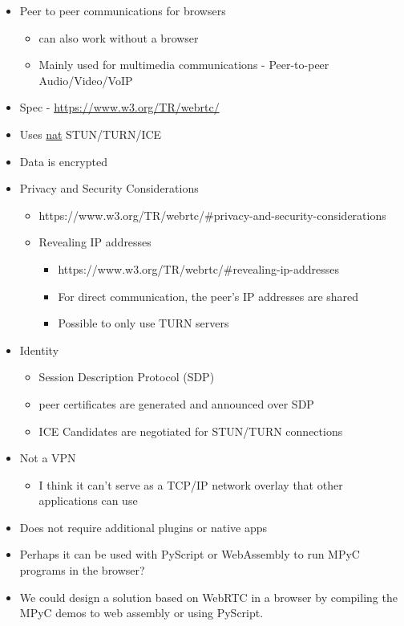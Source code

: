 \begin{itemize}
\tightlist
\item
  Peer to peer communications for browsers

  \begin{itemize}
  \tightlist
  \item
    can also work without a browser
  \item
    Mainly used for multimedia communications - Peer-to-peer Audio/Video/VoIP
  \end{itemize}
\item
  Spec - \href{https://www.w3.org/TR/webrtc/\#persistent-information-exposed-by-webrtc}{https://www.w3.org/TR/webrtc/}
\item
  Uses \hyperref[notes__02021-internet-protocol.md]{nat} STUN/TURN/ICE
\item
  Data is encrypted
\item
  Privacy and Security Considerations

  \begin{itemize}
  \tightlist
  \item
    https://www.w3.org/TR/webrtc/\#privacy-and-security-considerations
  \item
    Revealing IP addresses

    \begin{itemize}
    \tightlist
    \item
      https://www.w3.org/TR/webrtc/\#revealing-ip-addresses
    \item
      For direct communication, the peer's IP addresses are shared
    \item
      Possible to only use TURN servers
    \end{itemize}
  \end{itemize}
\item
  Identity

  \begin{itemize}
  \tightlist
  \item
    Session Description Protocol (SDP)
  \item
    peer certificates are generated and announced over SDP
  \item
    ICE Candidates are negotiated for STUN/TURN connections
  \end{itemize}
\item
  Not a VPN

  \begin{itemize}
  \tightlist
  \item
    I think it can't serve as a TCP/IP network overlay that other applications can use
  \end{itemize}
\item
  Does not require additional plugins or native apps
\item
  Perhaps it can be used with PyScript or WebAssembly to run MPyC programs in the browser?
\item
  We could design a solution based on WebRTC in a browser by compiling the MPyC demos to web assembly or using PyScript.


\end{itemize}
